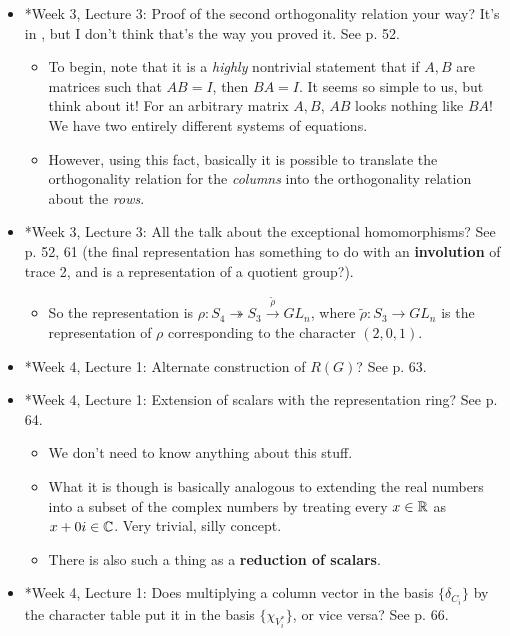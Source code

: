 \documentclass[../notes.tex]{subfiles}
\begin{document}
\begin{itemize}
\begin{itemize}
    \end{itemize}
    \item *Week 3, Lecture 3: Proof of the second orthogonality relation your way? It's in \textcite{bib:Serre}, but I don't think that's the way you proved it. See p. 52.
    \begin{itemize}
        \item To begin, note that it is a \emph{highly} nontrivial statement that if $A,B$ are matrices such that $AB=I$, then $BA=I$. It seems so simple to us, but think about it! For an arbitrary matrix $A,B$, $AB$ looks nothing like $BA$! We have two entirely different systems of equations.
        \item However, using this fact, basically it is possible to translate the orthogonality relation for the \emph{columns} into the orthogonality relation about the \emph{rows}.
    \end{itemize}
    \item *Week 3, Lecture 3: All the talk about the exceptional homomorphisms? See p. 52, 61 (the final representation has something to do with an \textbf{involution} of trace 2, and is a representation of a quotient group?).
    \begin{itemize}
        \item So the representation is $\rho:S_4\twoheadrightarrow S_3\xrightarrow{\tilde{\rho}}GL_n$, where $\tilde{\rho}:S_3\to GL_n$ is the representation of $\rho$ corresponding to the character $(2,0,1)$.
    \end{itemize}
    \item *Week 4, Lecture 1: Alternate construction of $R(G)$? See p. 63.
    \item *Week 4, Lecture 1: Extension of scalars with the representation ring? See p. 64.
    \begin{itemize}
        \item We don't need to know anything about this stuff.
        \item What it is though is basically analogous to extending the real numbers into a subset of the complex numbers by treating every $x\in\mathbb{R}$ as $x+0i\in\mathbb{C}$. Very trivial, silly concept.
        \item There is also such a thing as a \textbf{reduction of scalars}.
    \end{itemize}
    \item *Week 4, Lecture 1: Does multiplying a column vector in the basis $\{\delta_{C_i}\}$ by the character table put it in the basis $\{\chi_{V_i^*}\}$, or vice versa? See p. 66.

\end{itemize}
\end{document}
